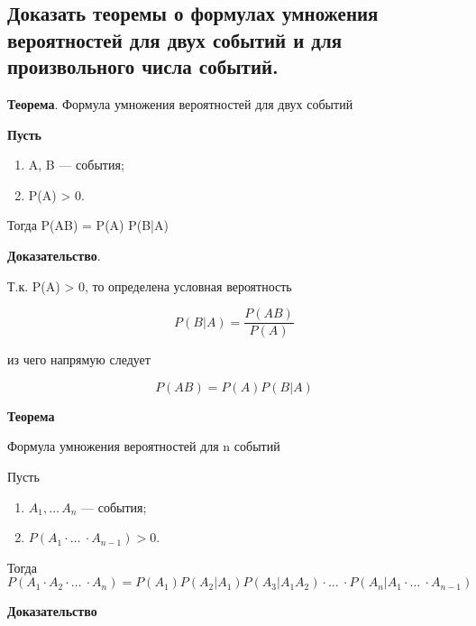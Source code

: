 \subsection{Доказать теоремы о формулах умножения вероятностей для двух событий и для произвольного числа событий.}

\textbf{Теорема}. Формула умножения вероятностей для двух событий 

\textbf{Пусть}

\begin{enumerate}
	\item A, B --- события;
	\item P(A) > 0.
\end{enumerate}

Тогда P(AB) = P(A) P(B|A)

\textbf{Доказательство}.

Т.к. P(A) > 0, то определена условная вероятность

\begin{equation}
	P(B|A) = \frac{P(AB)}{P(A)}
\end{equation}

из чего напрямую следует

\begin{equation}
	P(AB) = P(A) P(B|A)
\end{equation}

\textbf{Теорема}

Формула умножения вероятностей для n событий

Пусть

\begin{enumerate}
	\item $A_1, \dots\, A_n$ --- события;
	\item $P(A_1 \cdot \dots\ \cdot A_{n-1}) > 0$.
\end{enumerate}

Тогда
\begin{equation}
	P(A_1 \cdot A_2 \cdot \dots\ \cdot A_n) = P(A_1)P(A_2 | A_1)P(A_3|A_1A_2) \cdot \dots\ \cdot P(A_n|A_1 \cdot \dots\ \cdot A_{n-1})
\end{equation}

\textbf{Доказательство}

